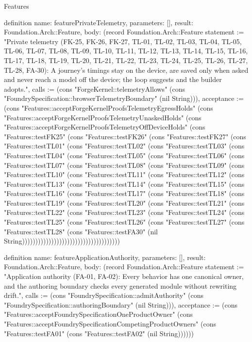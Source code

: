 \begin{lexlean}{Features}
\begin{semanticmodule}
definition{
  name: featurePrivateTelemetry,
  parameters: [],
  result: Foundation.Arch::Feature,
  body: (record Foundation.Arch::Feature {statement := "Private telemetry (FK-25, FK-26, FK-27, TL-01, TL-02, TL-03, TL-04, TL-05, TL-06, TL-07, TL-08, TL-09, TL-10, TL-11, TL-12, TL-13, TL-14, TL-15, TL-16, TL-17, TL-18, TL-19, TL-20, TL-21, TL-22, TL-23, TL-24, TL-25, TL-26, TL-27, TL-28, FA-30): A journey's timings stay on the device, are saved only when asked and never reach a model off the device; the loop suggests and the builder adopts.", calls := (cons "ForgeKernel::telemetryAllows" (cons "FoundrySpecification::browserTelemetryBoundary" (nil String))), acceptance := (cons "Features::acceptForgeKernelProofsTelemetryEgressHolds" (cons "Features::acceptForgeKernelProofsTelemetryUnaskedHolds" (cons "Features::acceptForgeKernelProofsTelemetryOffDeviceHolds" (cons "Features::testFK25" (cons "Features::testFK26" (cons "Features::testFK27" (cons "Features::testTL01" (cons "Features::testTL02" (cons "Features::testTL03" (cons "Features::testTL04" (cons "Features::testTL05" (cons "Features::testTL06" (cons "Features::testTL07" (cons "Features::testTL08" (cons "Features::testTL09" (cons "Features::testTL10" (cons "Features::testTL11" (cons "Features::testTL12" (cons "Features::testTL13" (cons "Features::testTL14" (cons "Features::testTL15" (cons "Features::testTL16" (cons "Features::testTL17" (cons "Features::testTL18" (cons "Features::testTL19" (cons "Features::testTL20" (cons "Features::testTL21" (cons "Features::testTL22" (cons "Features::testTL23" (cons "Features::testTL24" (cons "Features::testTL25" (cons "Features::testTL26" (cons "Features::testTL27" (cons "Features::testTL28" (cons "Features::testFA30" (nil String))))))))))))))))))))))))))))))))))))})
}

definition{
  name: featureApplicationAuthority,
  parameters: [],
  result: Foundation.Arch::Feature,
  body: (record Foundation.Arch::Feature {statement := "Application authority (FA-01, FA-02): Every behavior has one canonical owner, and the authoring boundary checks every generated module without rewriting drift.", calls := (cons "FoundrySpecification::admitAuthority" (cons "FoundrySpecification::authoringBoundary" (nil String))), acceptance := (cons "Features::acceptFoundrySpecificationOneProductOwner" (cons "Features::acceptFoundrySpecificationCompetingProductOwners" (cons "Features::testFA01" (cons "Features::testFA02" (nil String)))))})
}


\end{semanticmodule}
\end{lexlean}
